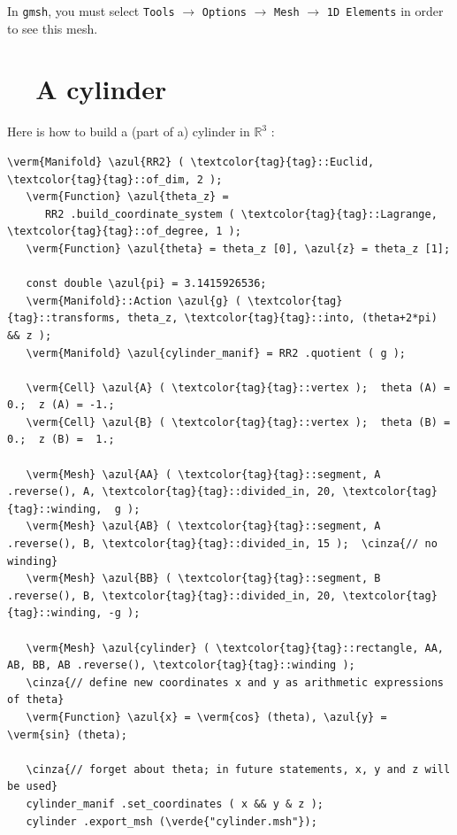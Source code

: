 In {\tt gmsh}, you must select {\small\tt Tools} $\to$ {\small\tt Options} $\to$
{\small\tt Mesh} $\to$ {\small\tt 1D Elements} in order to see this mesh.


\section{~~A cylinder}\label{\numb section 7.\numb parag 3}

Here is how to build a (part of a) cylinder in $ \mathbb{R}^3 $ :

\begin{Verbatim}[commandchars=\\\{\},formatcom=\small\tt,frame=single,
   label=parag-\ref{\numb section 7.\numb parag 3}.cpp,rulecolor=\color{coment},
   baselinestretch=0.94,framesep=2mm                                            ]
   \verm{Manifold} \azul{RR2} ( \textcolor{tag}{tag}::Euclid, \textcolor{tag}{tag}::of_dim, 2 );
   \verm{Function} \azul{theta_z} =
      RR2 .build_coordinate_system ( \textcolor{tag}{tag}::Lagrange, \textcolor{tag}{tag}::of_degree, 1 );
   \verm{Function} \azul{theta} = theta_z [0], \azul{z} = theta_z [1];

   const double \azul{pi} = 3.1415926536;
   \verm{Manifold}::Action \azul{g} ( \textcolor{tag}{tag}::transforms, theta_z, \textcolor{tag}{tag}::into, (theta+2*pi) && z );
   \verm{Manifold} \azul{cylinder_manif} = RR2 .quotient ( g );

   \verm{Cell} \azul{A} ( \textcolor{tag}{tag}::vertex );  theta (A) = 0.;  z (A) = -1.;
   \verm{Cell} \azul{B} ( \textcolor{tag}{tag}::vertex );  theta (B) = 0.;  z (B) =  1.;

   \verm{Mesh} \azul{AA} ( \textcolor{tag}{tag}::segment, A .reverse(), A, \textcolor{tag}{tag}::divided_in, 20, \textcolor{tag}{tag}::winding,  g );
   \verm{Mesh} \azul{AB} ( \textcolor{tag}{tag}::segment, A .reverse(), B, \textcolor{tag}{tag}::divided_in, 15 );  \cinza{// no winding}
   \verm{Mesh} \azul{BB} ( \textcolor{tag}{tag}::segment, B .reverse(), B, \textcolor{tag}{tag}::divided_in, 20, \textcolor{tag}{tag}::winding, -g );

   \verm{Mesh} \azul{cylinder} ( \textcolor{tag}{tag}::rectangle, AA, AB, BB, AB .reverse(), \textcolor{tag}{tag}::winding );
   \cinza{// define new coordinates x and y as arithmetic expressions of theta}
   \verm{Function} \azul{x} = \verm{cos} (theta), \azul{y} = \verm{sin} (theta);

   \cinza{// forget about theta; in future statements, x, y and z will be used}
   cylinder_manif .set_coordinates ( x && y & z );
   cylinder .export_msh (\verde{"cylinder.msh"});
\end{Verbatim}

